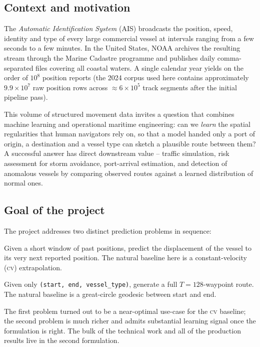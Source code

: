 \documentclass[oneside, a4paper, onecolumn, 11pt]{article}
\begin{document}
\subsection{Context and motivation}

The \emph{Automatic Identification System} (AIS) broadcasts the position,
speed, identity and type of every large commercial vessel at intervals
ranging from a few seconds to a few minutes.
In the United States, NOAA archives the resulting stream through the
Marine Cadastre programme and publishes daily comma-separated files
covering all coastal waters.
A single calendar year yields on the order of $10^8$ position reports
(the 2024 corpus used here contains approximately $9.9 \times 10^7$
raw position rows across $\approx 6 \times 10^5$ track segments after
the initial pipeline pass).

This volume of structured movement data invites a question that
combines machine learning and operational maritime engineering: can we
\emph{learn} the spatial regularities that human navigators rely on, so
that a model handed only a port of origin, a destination and a vessel
type can sketch a plausible route between them?
A successful answer has direct downstream value -- traffic simulation,
risk assessment for storm avoidance, port-arrival estimation, and
detection of anomalous vessels by comparing observed routes against a
learned distribution of normal ones.

\subsection{Goal of the project}

The project addresses two distinct prediction problems in sequence:

\begin{description}[leftmargin=*,style=nextline]
  \item[Next-step prediction (v1).]
  Given a short window of past positions, predict the displacement of
  the vessel to its very next reported position. The natural baseline
  here is a constant-velocity (\textsc{cv}) extrapolation.
  \item[Conditional full-route generation (v2 onward).]
  Given only \texttt{(start, end, vessel\_type)}, generate a full
  $T = 128$-waypoint route. The natural baseline is a great-circle
  geodesic between start and end.
\end{description}

The first problem turned out to be a near-optimal use-case for the
\textsc{cv} baseline; the second problem is much richer and admits
substantial learning signal once the formulation is right.
The bulk of the technical work and all of the production results live
in the second formulation.
\end{document}
